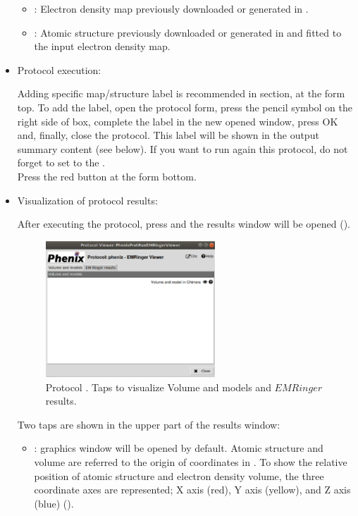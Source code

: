 \begin{itemize}
    \begin{itemize}
     \item {}: Electron density map previously downloaded or generated in \scipion.
     \item {}: Atomic structure previously downloaded or generated in \scipion and fitted to the input electron density map.
    \end{itemize}
    
 \item Protocol execution:

  Adding specific map/structure label is recommended in  section, at the form top. To add the label, open the protocol form, press the pencil symbol on the right side of  box, complete the label in the new opened window, press OK and, finally, close the protocol. This label will be shown in the output summary content (see below). If you want to run again this protocol, do not forget to set to  the .\\
  Press the  red button at the form bottom.
  
 \item Visualization of protocol results:
  
  After executing the protocol, press  and the results window will be opened (). 
  
  \begin{figure}[H]
     \centering 
     \captionsetup{width=.7\linewidth} 
     \includegraphics[width=0.60\textwidth]{Images_appendix/Fig140.pdf}
     \caption{Protocol . Taps to visualize Volume and models and $EMRinger$ results.}
     \label{fig:app_protocol_emringer_2}
    \end{figure}
    
   Two taps are shown in the upper part of the results window:
    \begin{itemize}
     \item {}: \chimera graphics window will be opened by default. Atomic structure and volume are referred to the origin of coordinates in \chimera. To show the relative position of atomic structure and electron density volume, the three coordinate axes are represented; X axis (red), Y axis (yellow), and Z axis (blue) ().


\end{itemize}
\end{itemize}
